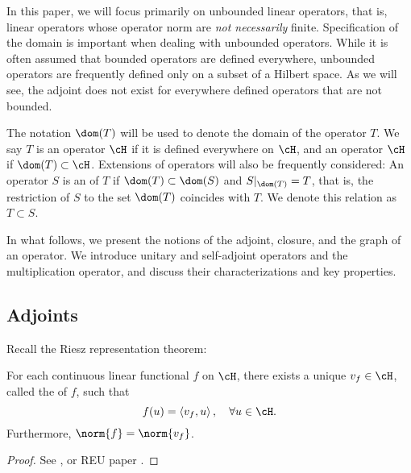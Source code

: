 \documentclass[oneside,reqno,letterpaper]{amsart}
\begin{document}
In this paper, we will focus primarily on unbounded linear operators, that is, linear operators whose operator norm are \textit{not necessarily} finite. 
Specification of the domain is important when dealing with unbounded operators. 
While it is often assumed that bounded operators are defined everywhere, unbounded operators are frequently defined only on a subset of a Hilbert space.
As we will see, the adjoint does not exist for everywhere defined operators that are not bounded. 

The notation \(\dom(T)\) will be used to denote the domain of the operator \(T\). 
We say \(T\) is an operator  \(\cH\) if it is defined everywhere on \(\cH\), and an operator  \(\cH\) if \(\dom(T) \subset \cH\). 
Extensions of operators will also be frequently considered: 
An operator \(S\) is an  of \(T\) if \(\dom(T) \subset \dom(S)\) and \(S|_{\dom(T)} = T\), that is, the restriction of \(S\) to the set \(\dom(T)\) coincides with \(T\). 
We denote this relation as \(T \subset S\). 

In what follows, we present the notions of the adjoint, closure, and the graph of an operator. 
We introduce unitary and self-adjoint operators and the multiplication operator, and discuss their characterizations and key properties.


\subsection{Adjoints}

Recall the Riesz representation theorem:
\begin{theorem}
\label{thm:riesz-representation}
  For each continuous linear functional \(f\) on \(\cH\), there exists a unique \(v_f \in \cH\), called the  of \(f\), such that \[
    f(u) = \left< v_f, u \right>, \quad \forall  u \in \cH . 
  \] 
  Furthermore, \(\norm{f} = \norm{v_f}\). 
\end{theorem}
\begin{proof}
  See \cite[p.~135]{brezis2011functional}, or REU paper \cite{adler2021hilbert}. 
\end{proof}
\end{document}
